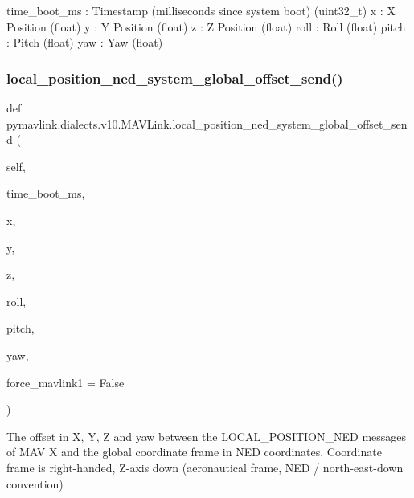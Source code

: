 \begin{DoxyVerb}
\begin{DoxyVerb}
\begin{DoxyVerb}
\begin{DoxyVerb}
\begin{DoxyVerb}
time_boot_ms              : Timestamp (milliseconds since system boot) (uint32_t)
x                         : X Position (float)
y                         : Y Position (float)
z                         : Z Position (float)
roll                      : Roll (float)
pitch                     : Pitch (float)
yaw                       : Yaw (float)\end{DoxyVerb}
 \mbox{\label{classpymavlink_1_1dialects_1_1v10_1_1MAVLink_af8fae86f58dcb82e1e7908ad6db867e9}} 
\subsubsection{\texorpdfstring{local\+\_\+position\+\_\+ned\+\_\+system\+\_\+global\+\_\+offset\+\_\+send()}{local\_position\_ned\_system\_global\_offset\_send()}}
{\footnotesize\ttfamily def pymavlink.\+dialects.\+v10.\+M\+A\+V\+Link.\+local\+\_\+position\+\_\+ned\+\_\+system\+\_\+global\+\_\+offset\+\_\+send (\begin{DoxyParamCaption}\item[{}]{self,  }\item[{}]{time\+\_\+boot\+\_\+ms,  }\item[{}]{x,  }\item[{}]{y,  }\item[{}]{z,  }\item[{}]{roll,  }\item[{}]{pitch,  }\item[{}]{yaw,  }\item[{}]{force\+\_\+mavlink1 = {\ttfamily False} }\end{DoxyParamCaption})}

\begin{DoxyVerb}The offset in X, Y, Z and yaw between the LOCAL_POSITION_NED messages
of MAV X and the global coordinate frame in NED
coordinates. Coordinate frame is right-handed, Z-axis
down (aeronautical frame, NED / north-east-down
convention)


\end{DoxyVerb}
\end{DoxyVerb}
\end{DoxyVerb}
\end{DoxyVerb}
\end{DoxyVerb}
